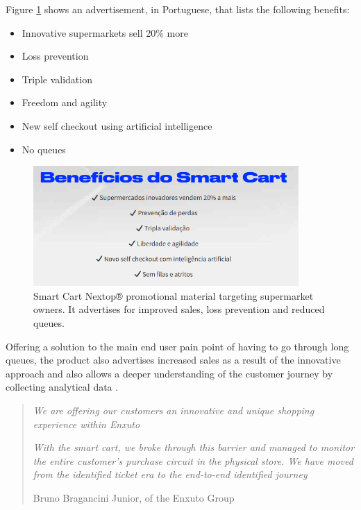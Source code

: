 \documentclass[openright]{normas-utf-tex} %
\begin{document}
Figure \ref{fig:nextopad} shows an advertisement, in Portuguese, that lists the following
benefits:

\begin{itemize}
    \item Innovative supermarkets sell 20\% more
    \item Loss prevention
    \item Triple validation
    \item Freedom and agility
    \item New self checkout using artificial intelligence
    \item No queues
\end{itemize}

\begin{figure}[H]
	\centering
	\includegraphics[width=0.9\textwidth]{./images/nextoppromo.png}
    \caption[Smart Cart Nextop® promotional material targetting supermarket owners]{Smart Cart Nextop® promotional material targeting supermarket owners. It advertises for improved sales, loss prevention and reduced queues.}
	\label{fig:nextopad}
\end{figure}

Offering a solution to the main end user pain point of having to go through
long queues, the product also advertises increased sales as a result of the
innovative approach and also allows a deeper understanding of the customer
journey by collecting analytical data \cite{Paraiba2022}.

\begin{quote}
\textit{We are offering our customers an innovative and unique shopping experience within Enxuto}

\textit{With the smart cart, we broke through this barrier and managed to monitor the
entire customer's purchase circuit in the physical store. We have moved
from the identified ticket era to the end-to-end identified journey}

    Bruno Bragancini Junior,  of the Enxuto Group \cite{Paraiba2022}
\end{quote}
\end{document}
